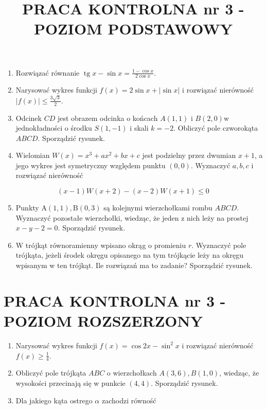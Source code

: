 \documentclass[10pt]{article}
\title{PRACA KONTROLNA nr 3 - POZIOM PODSTAWOWY }
\author{}
\date{}
\begin{document}
\maketitle
\begin{enumerate}
  \item Rozwiązać równanie $\operatorname{tg} x-\sin x=\frac{1-\cos x}{2 \cos x}$.
  \item Narysować wykres funkcji $f(x)=2 \sin x+|\sin x|$ i rozwiązać nierówność $|f(x)| \leqslant \frac{3 \sqrt{3}}{2}$.
  \item Odcinek $C D$ jest obrazem odcinka o końcach $A(1,1)$ i $B(2,0) \mathrm{w}$ jednokładności o środku $S(1,-1)$ i skali $k=-2$. Obliczyć pole czworokąta $A B C D$. Sporządzić rysunek.
  \item Wielomian $W(x)=x^{3}+a x^{2}+b x+c$ jest podzielny przez dwumian $x+1$, a jego wykres jest symetryczny względem punktu $(0,0)$. Wyznaczyć $a, b, c$ i rozwiązać nierówność
\end{enumerate}

$$
(x-1) W(x+2)-(x-2) W(x+1) \leqslant 0
$$

\begin{enumerate}
  \setcounter{enumi}{4}
  \item Punkty $\mathrm{A}(1,1), \mathrm{B}(0,3)$ są kolejnymi wierzchołkami rombu $A B C D$. Wyznaczyć pozostałe wierzchołki, wiedząc, że jeden z nich leży na prostej $x-y-2=0$. Sporządzić rysunek.
  \item W trójkąt równoramienny wpisano okrąg o promieniu $r$. Wyznaczyć pole trójkąta, jeżeli środek okręgu opisanego na tym trójkącie leży na okręgu wpisanym w ten trójkąt. Ile rozwiązań ma to zadanie? Sporządzić rysunek.
\end{enumerate}

\section*{PRACA KONTROLNA nr 3 - POZIOM ROZSZERZONY}
\begin{enumerate}
  \item Narysować wykres funkcji $f(x)=\cos 2 x-\sin ^{2} x$ i rozwiązać nierówność $f(x) \geqslant \frac{1}{4}$.
  \item Obliczyć pole trójkąta $A B C$ o wierzchołkach $A(3,6), B(1,0)$, wiedząc, że wysokości przecinają się w punkcie $(4,4)$. Sporządzić rysunek.
  \item Dla jakiego kąta ostrego $\alpha$ zachodzi równość
\end{enumerate}
\end{document}
